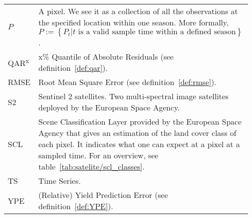 \begin{longtable}{p{0.12\linewidth} p{0.87\linewidth}}
	$P$       & A pixel. We see it as a collection of all the observations at the specified location within one season. More formally, $P := \left\{P_t | t\text{ is a valid sample time within a defined season}\right\}$.\\
    QAR\textsuperscript{x}       & x\% Quantile of Absolute Residuals  (see definition~\ref{def:qar}).\\
	RMSE         & Root Mean Square Error (see definition~\ref{def:rmse}).\\
	S2       & Sentinel 2 satellites. Two multi-spectral image satellites deployed by the European Space Agency.\\
	SCL       & Scene Classification Layer provided by the European Space Agency that gives an estimation of the land cover class of each pixel. It indicates what one can expect at a pixel at a sampled time. For an overview, see table~\ref{tab:satelite/scl_classes}.\\
	TS       & Time Series.\\
	YPE        & (Relative) Yield Prediction Error (see definition~\ref{def:YPE}).\\
\end{longtable} 

